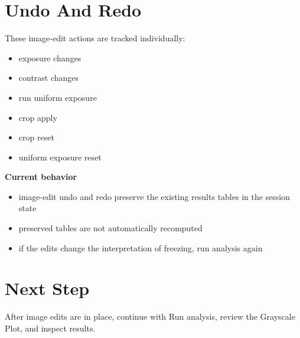 \documentclass[
  9pt,
  letterpaper,
  oneside,
  open=any,
  DIV=15,
  parskip=half-,
  headings=big,
  numbers=noenddot
]{scrbook}
\newcommand{\manuallead}[1]{%
  \vspace{0.15em}%
  {\sffamily\bfseries\color{ManualBlue}#1}\par\nobreak\vspace{0.05em}%
}
\begin{document}
\section{Undo And Redo}

These image-edit actions are tracked individually:


\begin{itemize}[leftmargin=*,itemsep=0.35em,topsep=0.4em]
\item exposure changes
\item contrast changes
\item run uniform exposure
\item crop apply
\item crop reset
\item uniform exposure reset
\end{itemize}

\manuallead{Current behavior}

\begin{itemize}[leftmargin=*,itemsep=0.35em,topsep=0.4em]
\item image-edit undo and redo preserve the existing results tables in the session state
\item preserved tables are not automatically recomputed
\item if the edits change the interpretation of freezing, run analysis again
\end{itemize}

\section{Next Step}

After image edits are in place, continue with Run analysis, review the Grayscale Plot, and inspect results.
\end{document}
